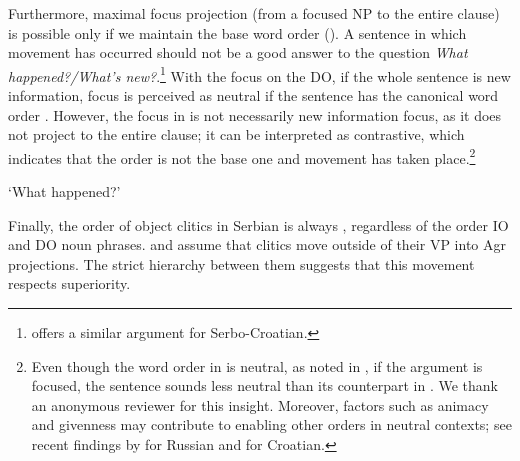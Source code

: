 \documentclass[output=paper,
modfonts,
newtxmath,
hidelinks
]{langscibook}
\begin{document}
\noindent Furthermore, maximal focus projection (from a focused NP to the entire clause) is possible only if we maintain the base word order (\citealt{hoehle82,vonstechowuhmann,haider92}). A sentence in which movement has occurred should not be a good answer to the question \textit{What happened?/What's new?}.\footnote{\citet[76]{stjepanovic-thesis} offers a similar argument for Serbo-Croatian.} With the focus on the DO, if the whole sentence is new information, focus is perceived as neutral if the sentence has the canonical word order . However, the focus in  is not necessarily new information focus, as it does not project to the entire clause; it can be interpreted as contrastive, which indicates that the order is not the base one and movement has taken place.\footnote{Even though the word order in  is neutral, as noted in , if the \datt{} argument is focused, the sentence sounds less neutral than its counterpart in . We thank an anonymous reviewer for this insight. Moreover, factors such as animacy and givenness may contribute to enabling other orders in neutral contexts; see recent findings by  \citet{titov17} for Russian and \citet{velnic-diss} for Croatian.}    

\ea `What happened?'
\label{focusa}
\label{focusb}
\z \z


\noindent Finally, the order of object clitics in Serbian is always \datt{} \before{} \accc, regardless of the order IO and DO noun phrases. \citet{stjepanovic-thesis} and \citet{boskovic2001} assume that clitics move outside of their VP into Agr projections. The strict hierarchy between them suggests that this movement respects superiority.\largerpage[2]
	\ea
    \z \z
	
\end{document}
